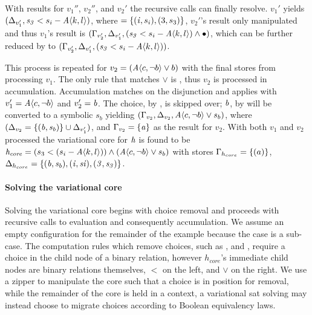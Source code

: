 With results for $v_{1}''$, $v_{2}''$, and $v_{2}'$ the recursive calls can finally
resolve. $v_{1}'$ yields $(\aStore{v_{1}'}, \kf{s_{3}} < s_{i} - \chc[A]{k,l})$,
where  $= \{(\mathit{i}, s_{i}), (3, s_{3})\}$, $v_{2}'$'s result
only manipulated \eStore{} and thus $v_{1}$'s result is $(\eStore{v_{2}'},
\aStore{v_{1}'}, (\kf{s_{3}} < s_{i} - \chc[A]{k,l}) \wedge \unit{})$, which can
be further reduced by  to \newline{} $(\eStore{v_{2}'},
\aStore{v_{1}'}, (\kf{s_{3}} < s_{i} - \chc[A]{k,l}))$.

This process is repeated for $v_{2} = (\chc[A]{c,\neg b} \vee b)$ with the final
stores from processing $v_{1}$. The only rule that matches $\vee$ is
, thus $v_{2}$ is processed in accumulation. Accumulation
matches on the disjunction and applies  with $v_{1}' =
\chc[A]{c,\neg b}$ and $v_{2}' = \mathit{b}$. The choice, by , is
skipped over; $\mathit{b}$, by  will be converted to a symbolic
$s_{b}$ yielding $(\eStore{v_{2}}, \aStore{v_{2}}, \chc[A]{c,\neg b} \vee
s_{b})$, where $(\Delta_{v_{2}} = \{(\mathit{b}, \mathit{s_{b}})\} \cup
\Delta_{v_{1}'})$, and $\Gamma_{v_{2}} = \{\mathit{a}\}$ as the result for $v_{2}$.
With both $v_{1}$ and $v_{2}$ processed the variational core for $\mathit{h}$ is
found to be $\kf{h_{core}} = (s_{3} < (s_{i} - \chc[A]{k,l})) \wedge
(\chc[A]{c,\neg b} \vee s_{b})$ with stores $\Gamma_{h_{core}} = \{(a)\}$,
$\Delta_{h_{core}} = \{\mathit{(b,s_{b}), (i,s{i}), (3,s_{3})}\}$.%

\paragraph{Solving the variational core}
Solving the variational core begins with choice removal and proceeds with
recursive calls to evaluation and consequently accumulation. We assume an empty
configuration for the remainder of the example because the \vc{} case is a
sub-case. The computation rules which remove choices, such as ,
and , require a choice in the child node of a binary
relation, however $h_{core}$'s immediate child nodes are binary relations
themselves, $<$ on the left, and $\vee{}$ on the right. We use a zipper to
manipulate the core such that a choice is in position for removal, while the
remainder of the core is held in a context, a variational \ac{sat} solving may
instead choose to migrate choices according to Boolean equivalency laws.

